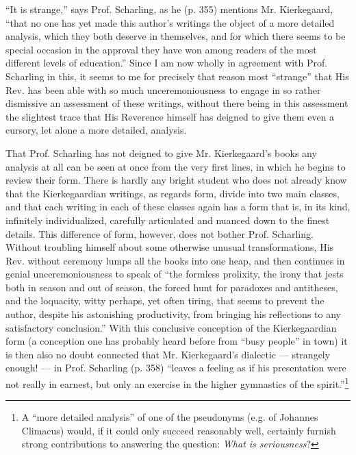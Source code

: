 \documentclass[12pt,a4paper,openany]{book}
\newcommand{\opage}[1]{\marginnote{\footnotesize\textit{[#1]}}}
\begin{document}
``It is strange,'' says Prof. Scharling, as he
(p. 355) mentions Mr. Kierkegaard, ``that no one has yet
made this author's writings the object of a
more detailed analysis, which they both deserve in themselves, and
for which there seems to be special occasion in the approval
they have won among readers
of the most different levels of education.'' Since I am now wholly in agreement
with Prof. Scharling in this, it seems to me for precisely that reason
most ``strange'' that His Rev. has been able with so much unceremoniousness
to engage in so rather dismissive an
\setcounter{footnote}{0}%
\opage{13}assessment of these writings, without there being in this
assessment the slightest trace that His Reverence %
himself has deigned to give them even a cursory, let alone
a more detailed, analysis.

That Prof. Scharling has not deigned to give Mr.
Kierkegaard's books any analysis at all can be seen at once from the
very first lines, in which he begins to review their
form. There is hardly any bright student who does not
already know that the Kierkegaardian writings, as regards form,
divide into two main classes, and that each writing
in each of these classes again has a form that is, in its kind, infinitely
individualized, carefully articulated and nuanced down to the finest
details. This difference of form,
however, does not bother Prof. Scharling. Without
troubling himself about some otherwise unusual transformations,
His Rev. without ceremony lumps all the books into
one heap, and then continues in genial unceremoniousness to
speak of ``the formless prolixity, the irony that jests both in season
and out of season, the forced hunt for paradoxes
and antitheses, and the loquacity, witty perhaps, yet often tiring,
that seems to prevent the author, despite
his astonishing productivity, from bringing his reflections
to any satisfactory conclusion.'' With
this conclusive conception of the Kierkegaardian form
(a conception one has probably heard before from ``busy
people'' in town) it is then also no doubt connected
that Mr. Kierkegaard's dialectic --- strangely enough! ---
in Prof. Scharling (p. 358) ``leaves a feeling
as if his presentation were not really in earnest, but only
an exercise in the higher gymnastics of the spirit.''\footnote[1]{A ``more detailed analysis'' of one of the pseudonyms (e.g. of Johannes Climacus) would, if it could only succeed reasonably well, certainly furnish strong contributions to answering the question: \emph{What is seriousness}?}
\end{document}
